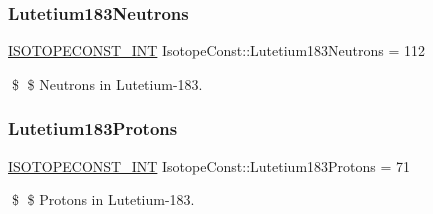 \subsubsection{\texorpdfstring{Lutetium183\+Neutrons}{Lutetium183Neutrons}}
{\footnotesize\ttfamily \mbox{\hyperlink{group___isotope_const-_macros_ga5f18360b3e99483a35c32d789e62621c}{I\+S\+O\+T\+O\+P\+E\+C\+O\+N\+S\+T\+\_\+\+I\+NT}} Isotope\+Const\+::\+Lutetium183\+Neutrons = 112}

\$ \$ Neutrons in Lutetium-\/183. \mbox{\label{group___isotope_const-_lutetium-_lu183_gac3ec6dfc1f8b179f70e3360a815716c5}} 
\subsubsection{\texorpdfstring{Lutetium183\+Protons}{Lutetium183Protons}}
{\footnotesize\ttfamily \mbox{\hyperlink{group___isotope_const-_macros_ga5f18360b3e99483a35c32d789e62621c}{I\+S\+O\+T\+O\+P\+E\+C\+O\+N\+S\+T\+\_\+\+I\+NT}} Isotope\+Const\+::\+Lutetium183\+Protons = 71}

\$ \$ Protons in Lutetium-\/183. 